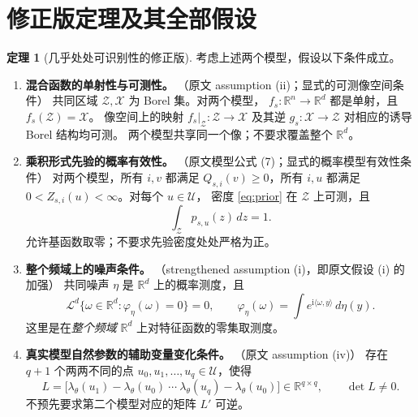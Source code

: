 \documentclass[UTF8,fontset=fandol,11pt,a4paper]{ctexart}
\theoremstyle{definition}
\newtheorem{theorem}{定理}
\newcommand{\R}{\mathbb R}
\newcommand{\Zset}{\mathcal Z}
\newcommand{\Xset}{\mathcal X}
\newcommand{\Uset}{\mathcal U}
\newcommand{\Leb}{\mathcal L}
\newcommand{\ip}[2]{\langle #1,#2\rangle}
\begin{document}
\section{修正版定理及其全部假设}

\begin{theorem}[几乎处处可识别性的修正版]\label{thm:main}
考虑上述两个模型，假设以下条件成立。
\begin{enumerate}[label=\textnormal{(\arabic*)},leftmargin=*,itemsep=5pt]
\item \textbf{混合函数的单射性与可测性。}
\textnormal{（原文 assumption (ii)；显式的可测像空间条件）}
共同区域 $\Zset,\Xset$ 为 Borel 集。对两个模型，
$f_s:\R^n\to\R^d$ 都是单射，且 $f_s(\Zset)=\Xset$。
像空间上的映射 $f_s|_{\Zset}:\Zset\to\Xset$ 及其逆
$g_s:\Xset\to\Zset$ 对相应的诱导 Borel 结构均可测。
两个模型共享同一个像；不要求覆盖整个 $\R^d$。

\item \textbf{乘积形式先验的概率有效性。}
\textnormal{（原文模型公式 (7)；显式的概率模型有效性条件）}
对两个模型，所有 $i,v$ 都满足 $Q_{s,i}(v)\ge0$，所有 $i,u$ 都满足
$0<Z_{s,i}(u)<\infty$。对每个 $u\in\Uset$，
密度 \eqref{eq:prior} 在 $\Zset$ 上可测，且
\[
 \int_{\Zset}p_{s,u}(z)\,dz=1.
\]
允许基函数取零；不要求先验密度处处严格为正。

\item \textbf{整个频域上的噪声条件。}
\textnormal{（strengthened assumption (i)，即原文假设 (i) 的加强）}
共同噪声 $\eta$ 是 $\R^d$ 上的概率测度，且
\begin{equation}
 \Leb^d\{\omega\in\R^d:\varphi_\eta(\omega)=0\}=0,
 \qquad
 \varphi_\eta(\omega)=\int e^{\mathrm i\ip{\omega}{y}}\,d\eta(y).
 \label{eq:noise}
\end{equation}
这里是在\emph{整个频域} $\R^d$ 上对特征函数的零集取测度。

\item \textbf{真实模型自然参数的辅助变量变化条件。}
\textnormal{（原文 assumption (iv)）}
存在 $q+1$ 个两两不同的点 $u_0,u_1,\ldots,u_q\in\Uset$，使得
\begin{equation}
 L=\bigl[\lambda_\theta(u_1)-\lambda_\theta(u_0)\ \cdots\
         \lambda_\theta(u_q)-\lambda_\theta(u_0)\bigr]
 \in\R^{q\times q},\qquad \det L\ne0. \label{eq:L}
\end{equation}
不预先要求第二个模型对应的矩阵 $L'$ 可逆。


\end{enumerate}
\end{theorem}
\end{document}
